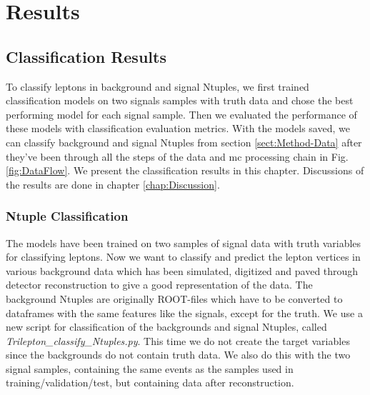 \documentclass[a4paper, american, 12pt]{report}
\begin{document}

	\part{Results}
	\label{part:Results} 
	
	\chapter{Classification Results}
	\label{chap:Result-ClassResult}
	To classify leptons in background and signal Ntuples, we first trained classification models on two signals samples with truth data and chose the best performing model for each signal sample. Then we evaluated the performance of these models with classification evaluation metrics. With the models saved, we can classify background and signal Ntuples from section \ref{sect:Method-Data} after they've been through all the steps of the data and \acrshort{mc} processing chain in Fig. \ref{fig:DataFlow}. We present the classification results in this chapter. Discussions of the results are done in chapter \ref{chap:Discussion}.
	
	
	\section{Ntuple Classification} 
	\label{sect:Result-BkgClass}
	The models have been trained on two samples of signal data with truth variables for classifying leptons. Now we want to classify and predict the lepton vertices in various background data which has been simulated, digitized and paved through detector reconstruction to give a good representation of the data. The background Ntuples are originally ROOT-files which have to be converted to dataframes with the same features like the signals, except for the truth. We use a new script for classification of the backgrounds and signal Ntuples, called \textit{Trilepton\_classify\_Ntuples.py}. This time we do not create the target variables since the backgrounds do not contain truth data. We also do this with the two signal samples, containing the same events as the samples used in training/validation/test, but containing data after reconstruction.
	
\end{document}
